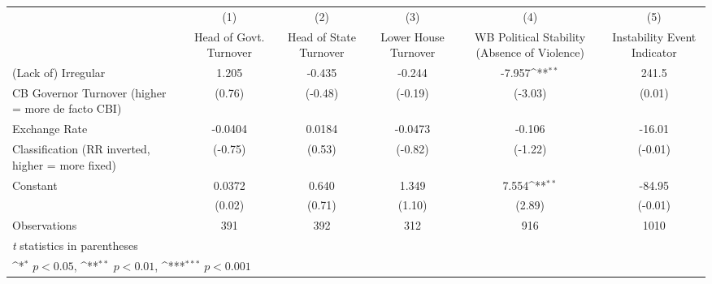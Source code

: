 {
\def\sym#1{\ifmmode^{#1}\else\(^{#1}\)\fi}
\begin{tabular}{l*{5}{c}}
\hline\hline
                    &\multicolumn{1}{c}{(1)}&\multicolumn{1}{c}{(2)}&\multicolumn{1}{c}{(3)}&\multicolumn{1}{c}{(4)}&\multicolumn{1}{c}{(5)}\\
                    &\multicolumn{1}{c}{Head of Govt. Turnover}&\multicolumn{1}{c}{Head of State Turnover}&\multicolumn{1}{c}{Lower House Turnover}&\multicolumn{1}{c}{WB Political Stability (Absence of Violence)}&\multicolumn{1}{c}{Instability Event Indicator}\\
\hline
(Lack of) Irregular &       1.205         &      -0.435         &      -0.244         &      -7.957\sym{**} &       241.5         \\
CB Governor Turnover (higher = more de facto CBI)&      (0.76)         &     (-0.48)         &     (-0.19)         &     (-3.03)         &      (0.01)         \\
[1em]
Exchange Rate       &     -0.0404         &      0.0184         &     -0.0473         &      -0.106         &      -16.01         \\
Classification (RR inverted, higher = more fixed)&     (-0.75)         &      (0.53)         &     (-0.82)         &     (-1.22)         &     (-0.01)         \\
[1em]
Constant            &      0.0372         &       0.640         &       1.349         &       7.554\sym{**} &      -84.95         \\
                    &      (0.02)         &      (0.71)         &      (1.10)         &      (2.89)         &     (-0.01)         \\
\hline
Observations        &         391         &         392         &         312         &         916         &        1010         \\
\hline\hline
\multicolumn{6}{l}{\footnotesize \textit{t} statistics in parentheses}\\
\multicolumn{6}{l}{\footnotesize \sym{*} \(p<0.05\), \sym{**} \(p<0.01\), \sym{***} \(p<0.001\)}\\
\end{tabular}
}
